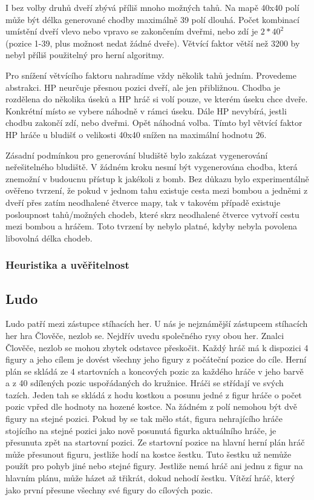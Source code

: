 I bez volby druhů dveří zbývá příliš mnoho možných tahů. Na mapě 40x40 polí může být délka generované chodby maximálně 39 polí dlouhá. Počet kombinací umístění dveří vlevo nebo vpravo se zakončením dveřmi, nebo zdí je $2*40^2$ (pozice 1-39, plus možnost nedat žádné dveře). Větvící faktor větší než 3200 by nebyl příliš použitelný pro herní algoritmy. 

Pro snížení větvícího faktoru nahradíme vždy několik tahů jedním. Provedeme abstrakci. HP neurčuje přesnou pozici dveří, ale jen přibližnou. Chodba je rozdělena do několika úseků a HP hráč si volí pouze, ve kterém úseku chce dveře. Konkrétní místo se vybere náhodně v rámci úseku. Dále HP nevybírá, jestli chodbu zakončí zdí, nebo dveřmi. Opět náhodná volba. Tímto byl větvící faktor HP hráče u bludišť o velikosti 40x40 snížen na maximální hodnotu 26.

Zásadní podmínkou pro generování bludiště bylo zakázat vygenerování neřešitelného bludiště. V žádném kroku nesmí být vygenerována chodba, která znemožní v budoucnu přístup k jakékoli z bomb. Bez důkazu bylo experimentálně ověřeno tvrzení, že pokud v jednom tahu existuje cesta mezi bombou a jedněmi z dveří přes zatím neodhalené čtverce mapy, tak v takovém případě existuje posloupnost tahů/možných chodeb, které skrz neodhalené čtverce vytvoří cestu mezi bombou a hráčem. Toto tvrzení by nebylo platné, kdyby nebyla povolena libovolná délka chodeb.

\subsubsection{Heuristika a uvěřitelnost}



\subsection{Ludo}

Ludo patří mezi zástupce stíhacích her. U nás je nejznámější zástupcem stíhacích her hra Člověče, nezlob se. Nejdřív uvedu společného rysy obou her. Znalci Člověče, nezlob se mohou zbytek odstavce přeskočit. Každý hráč má k dispozici 4 figury a jeho cílem je dovést všechny jeho figury z počáteční pozice do cíle. Herní plán se skládá ze 4 startovních a koncových pozic za každého hráče v jeho barvě a z 40 sdílených pozic uspořádaných do kružnice. Hráči se střídají ve svých tazích. Jeden tah se skládá z hodu kostkou a posunu jedné z figur hráče o počet pozic vpřed dle hodnoty na hozené kostce. Na žádném z polí nemohou být dvě figury na stejné pozici. Pokud by se tak mělo stát, figura nehrajícího hráče stojícího na stejné pozici jako nově posunutá figurka aktuálního hráče, je přesunuta zpět na startovní pozici. Ze startovní pozice na hlavní herní plán hráč může přesunout figuru, jestliže hodí na kostce šestku. Tuto šestku už nemůže použít pro pohyb jiné nebo stejné figury. Jestliže nemá hráč ani jednu z figur na hlavním plánu, může házet až třikrát, dokud nehodí šestku. Vítězí hráč, který jako první přesune všechny své figury do cílových pozic.

